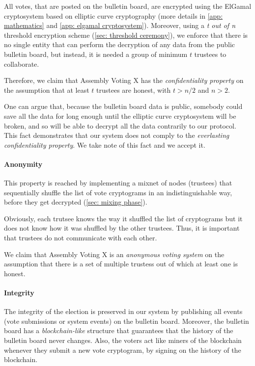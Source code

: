 All votes, that are posted on the bulletin board, are encrypted using the ElGamal cryptosystem based on elliptic curve cryptography (more details in \cref{app: mathematics} and \cref{app: elgamal cryptosystem}). Moreover, using a \textit{t out of n} threshold encryption scheme (\cref{sec: threshold ceremony}), we enforce that there is no single entity that can perform the decryption of any data from the public bulletin board, but instead, it is needed a group of minimum $t$ trustees to collaborate.

Therefore, we claim that Assembly Voting X has the \textit{confidentiality property} on the assumption that at least $t$ trustees are honest, with \( t > n / 2 \) and \( n > 2 \).

One can argue that, because the bulletin board data is public, somebody could save all the data for long enough until the elliptic curve cryptosystem will be broken, and so will be able to decrypt all the data contrarily to our protocol. This fact demonstrates that our system does not comply to the \textit{everlasting confidentiality property}. We take note of this fact and we accept it.

\paragraph{Anonymity}
This property is reached by implementing a mixnet of nodes (trustees) that sequentially shuffle the list of vote cryptograms in an indistinguishable way, before they get decrypted (\cref{sec: mixing phase}).

Obviously, each trutsee knows the way it shuffled the list of cryptograms but it does not know how it was shuffled by the other trustees. Thus, it is important that trustees do not communicate with each other.

We claim that Assembly Voting X is an \textit{anonymous voting system} on the assumption that there is a set of multiple trustess out of which at least one is honest.

\paragraph{Integrity}
The integrity of the election is preserved in our system by publishing all events (vote submissions or system events) on the bulletin board. Moreover, the bulletin board has a \textit{blockchain-like} structure that guarantees that the history of the bulletin board never changes. Also, the voters act like miners of the blockchain whenever they submit a new vote cryptogram, by signing on the history of the blockchain.

